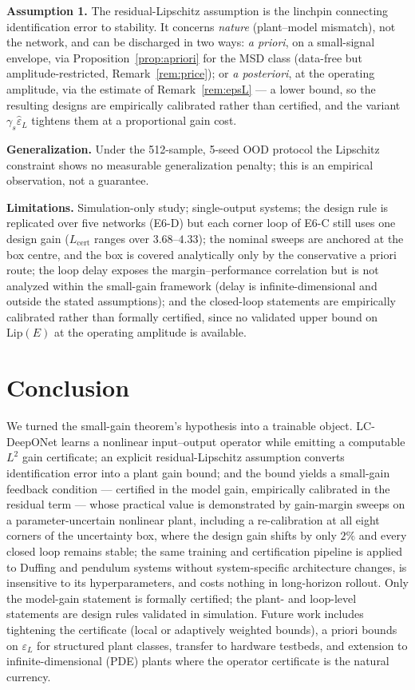 \documentclass[11pt,sagev,times]{sagej}
\newcommand{\Ltwo}{L^2}
\newcommand{\Lhat}{L_{\mathrm{cert}}}
\newcommand{\epsL}{\varepsilon_L}
\begin{document}
\textbf{Assumption 1.} The residual-Lipschitz assumption is the linchpin
connecting identification error to stability. It concerns \emph{nature}
(plant--model mismatch), not the network, and can be discharged in two ways:
\emph{a priori}, on a small-signal envelope, via
Proposition~\ref{prop:apriori} for the MSD class (data-free but
amplitude-restricted, Remark~\ref{rem:price}); or \emph{a posteriori}, at the
operating amplitude, via the estimate of Remark~\ref{rem:epsL} --- a lower
bound, so the resulting designs are empirically calibrated rather than
certified, and the variant $\gamma_s\hat\epsL$ tightens them at a
proportional gain cost.

\textbf{Generalization.} Under the 512-sample, 5-seed OOD protocol the
Lipschitz constraint shows no measurable generalization penalty; this is an
empirical observation, not a guarantee.

\textbf{Limitations.} Simulation-only study; single-output systems; the design
rule is replicated over five networks (E6-D) but each corner loop of E6-C still
uses one design gain ($\Lhat$ ranges over $3.68$--$4.33$); the nominal
sweeps are anchored at the box centre, and
the box is covered analytically only by the conservative a priori route; the
loop delay exposes the margin--performance correlation but is not analyzed
within the small-gain framework (delay is infinite-dimensional and outside
the stated assumptions); and the closed-loop statements are empirically
calibrated rather than formally certified, since no validated upper bound on
$\mathrm{Lip}(E)$ at the operating amplitude is available.

\section{Conclusion}\label{sec:conclusion}
We turned the small-gain theorem's hypothesis into a trainable object.
LC-DeepONet learns a nonlinear input--output operator while emitting a
computable $\Ltwo$ gain certificate; an explicit residual-Lipschitz
assumption converts identification error into a plant gain bound; and the
bound yields a small-gain feedback condition --- certified in the model
gain, empirically calibrated in the residual term --- whose practical value is
demonstrated by gain-margin sweeps on a parameter-uncertain nonlinear plant,
including a re-calibration at all eight corners of the uncertainty box, where
the design gain shifts by only $2\%$ and every closed loop remains stable;
the same training and certification pipeline is applied to Duffing
and pendulum systems without system-specific architecture changes, is
insensitive to its hyperparameters, and costs nothing in
long-horizon rollout. Only the model-gain statement is formally certified;
the plant- and loop-level statements are design rules validated in
simulation. Future work
includes tightening the certificate (local or adaptively weighted bounds),
a priori bounds on $\epsL$ for structured plant classes, transfer to hardware
testbeds, and extension to infinite-dimensional (PDE) plants where the
operator certificate is the natural currency.
\end{document}
